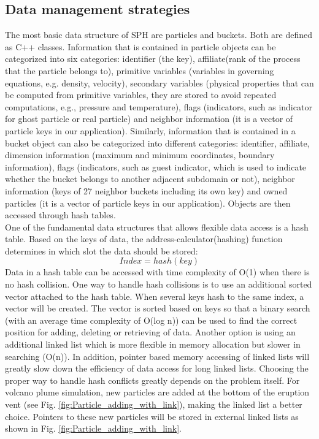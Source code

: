 \documentclass[procedia]{easychair}
\begin{document}
\subsection{Data management strategies}
The most basic data structure of SPH are particles and buckets. Both are defined as C++ classes. Information that is contained in particle objects can be categorized into six categories: identifier (the key), affiliate(rank of the process that the particle belongs to), primitive variables (variables in governing equations, e.g. density, velocity), secondary variables (physical properties that can be computed from primitive variables, they are stored to avoid repeated computations, e.g., pressure and temperature), flags (indicators, such as indicator for ghost particle or real particle) and neighbor information (it is a vector of particle keys in our application). Similarly,  information that is contained in a bucket object can also be categorized into different categories: identifier, affiliate, dimension information (maximum and minimum coordinates, boundary information), flags (indicators, such as guest indicator, which is used  to indicate whether the bucket belongs to another adjacent subdomain or not), neighbor information (keys of 27 neighbor buckets including its own key) and owned particles (it is a vector of particle keys in our application). Objects are then accessed through hash tables.\\
One of the fundamental data structures that allows flexible data access is a hash table. Based on the keys of data, the address-calculator(hashing) function determines in which slot the data should be stored:
\begin{equation}
Index = hash(key)
\end{equation}
Data in a hash table can be accessed with time complexity of O(1) when there is no hash collision. One way to handle hash collisions is to use an additional sorted vector attached to the hash table. When several keys hash to the same index, a vector will be created. The vector is sorted based on keys so that a binary search (with an average time complexity of O(log n)) can be used to find the correct position for adding, deleting or retrieving of data. Another option is using an additional linked list which is more flexible in memory allocation but slower in searching (O(n)). In addition, pointer based memory accessing of linked lists will greatly slow down the efficiency of data access for long linked lists. Choosing the proper way to handle hash conflicts greatly depends on the problem itself. For volcano plume simulation, new particles are added at the bottom of the eruption vent (see Fig. \ref{fig:Particle_adding_with_link}), making the linked list a better choice. Pointers to these new particles will be stored in external linked lists as shown in Fig. \ref{fig:Particle_adding_with_link}.
\end{document}
